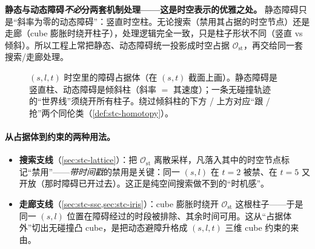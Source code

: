 \begin{insight}
\textbf{静态与动态障碍\emph{不必}分两套机制处理——这是时空表示的优雅之处。}\;
静态障碍只是“斜率为零的动态障碍”：竖直时空柱。无论搜索（禁用其占据的时空节点）还是走廊（cube 膨胀时绕开柱子），处理逻辑完全一致，只是柱子形状不同（竖直 vs 倾斜）。所以工程上常把静态、动态障碍统一投影成时空占据 $\mathcal{O}_{\mathrm{st}}$，再交给同一套搜索/走廊处理。
\end{insight}

\begin{figure}[ht]
\centering
{}
\caption{$(s,l,t)$ 时空里的障碍占据体（在 $(s,t)$ 截面上画）。静态障碍是竖直柱、动态障碍是倾斜柱（斜率 $=$ 其速度）；一条无碰撞轨迹的“世界线”须绕开所有柱子。绕过倾斜柱的下方 / 上方对应“跟 / 抢”两个同伦类（\cref{def:stc-homotopy}）。}
\label{fig:stc-stcolumn}
\end{figure}

\paragraph{从占据体到约束的两种用法。}
\begin{itemize}
  \item \textbf{搜索支线}（\cref{sec:stc-lattice}）：把 $\mathcal{O}_{\mathrm{st}}$ 离散采样，凡落入其中的时空节点标记“禁用”——\emph{带时间戳}的禁用是关键：同一 $(s,l)$ 在 $t=2$ 被禁、在 $t=5$ 又开放（那时障碍已开过去）。这正是纯空间搜索做不到的“时机感”。
  \item \textbf{走廊支线}（\cref{sec:stc-ssc,sec:stc-iris}）：cube 膨胀时绕开 $\mathcal{O}_{\mathrm{st}}$ 这根柱子——于是同一 $(s,l)$ 位置在障碍经过的时段被排除、其余时间可用。这从“占据体外”切出无碰撞凸 cube，是把动态避障升格成 $(s,l,t)$ 三维 cube 约束的来由。
\end{itemize}

